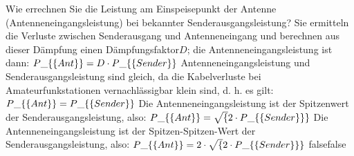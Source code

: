     {Wie errechnen Sie die Leistung am Einspeisepunkt der Antenne (Antenneneingangsleistung) bei bekannter Senderausgangsleistung?}
    {Sie ermitteln die Verluste zwischen Senderausgang und Antenneneingang und berechnen aus dieser Dämpfung einen Dämpfungsfaktor$ D$; die Antenneneingangsleistung ist dann: $P\_\{\textrm\{Ant\}\} = D\cdot P\_\{\textrm\{Sender\}\}$}
    {Antenneneingangsleistung und Senderausgangsleistung sind gleich, da die Kabelverluste bei Amateurfunkstationen vernachlässigbar klein sind, d. h. es gilt: $P\_\{\textrm\{Ant\}\} = P\_\{\textrm\{Sender\}\}$}
    {Die Antenneneingangsleistung ist der Spitzenwert der Senderausgangsleistung, also: $P\_\{\textrm\{Ant\}\} = \sqrt\{2\cdot P\_\{\textrm\{Sender\}\}\}$}
    {Die Antenneneingangsleistung ist der Spitzen-Spitzen-Wert der Senderausgangsleistung, also: $P\_\{\textrm\{Ant\}\} = 2\cdot\sqrt\{2\cdot P\_\{\textrm\{Sender\}\}\}$}
    {false}{false}